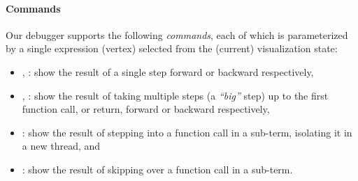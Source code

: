 \paragraph{Commands}
Our debugger supports the following \emph{commands}, each of which
is parameterized by a single expression (vertex) selected from the
(current) visualization state:
%
\begin{itemize}
%
\item \stepforwardsym, \stepbackwardsym:
      show the result of a single step forward or backward respectively,
%
\item \jumpforwardsym, \jumpbackwardsym:
      show the result of taking multiple steps (a \emph{``big''} step)
      up to the first function call, or return, forward or backward
      respectively,
%
\item \stepintosym:
      show the result of stepping into a function call in a sub-term,
      isolating it in a new thread, and
%
\item \stepoversym:
      show the result of skipping over a function call in a sub-term.
\end{itemize}

